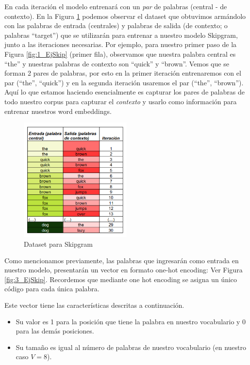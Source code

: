 \documentclass[12pt,a4paper]{article}
\begin{document}
\begin{sloppypar}
En cada iteración el modelo entrenará con un \textit{par} de palabras (central - de contexto). En la Figura \ref{fig:2_EjSkip} podemos observar el dataset que obtuvimos armándolo con las palabras de entrada (centrales) y palabras de salida (de contexto; o palabras “target”) que se utilizarán para entrenar a nuestro modelo Skipgram, junto a las iteraciones necesarias.  Por ejemplo, para nuestro primer paso de la Figura \ref{fig:1_EjSkip} (primer fila), observamos que nuestra palabra central es “the” y nuestras palabras de contexto son “quick” y “brown”. Vemos que se forman 2 pares de palabras, por esto en la primer iteración entrenaremos con el par (“the”, “quick”) y en la segunda iteración usaremos el par (“the”, “brown”). Aquí lo que estamos haciendo esencialmente es capturar los pares de palabras de todo nuestro corpus para capturar el \textit{contexto} y usarlo como información para entrenar nuestros word embeddings. 

\begin{figure}[H]    %
\centering
\includegraphics[width=0.5\textwidth]{images/Ejemplo_Skipgram/2_EjSkip.png}
\caption{Dataset para Skipgram} 
\label{fig:2_EjSkip}
\end{figure}

\cleardoublepage

Como mencionamos previamente, las palabras que ingresarán como entrada en nuestro modelo, presentarán un vector en formato one-hot encoding: Ver Figura \ref{fig:3_EjSkip}. Recordemos que mediante one hot encoding se asigna un único código para cada única palabra. 

Este vector tiene las características descritas a continuación.
\begin{itemize}
\item Su valor es 1 para la posición que tiene la palabra en nuestro vocabulario y 0 para las demás posiciones.
\item Su tamaño es igual al número de palabras de nuestro vocabulario (en nuestro caso $V = 8$). 
\end{itemize}


\end{sloppypar}
\end{document}
